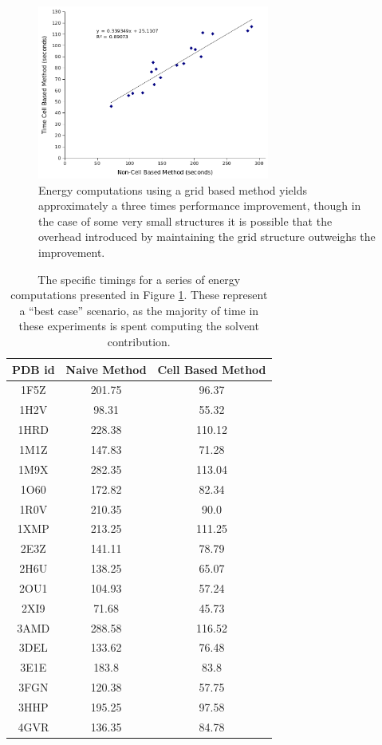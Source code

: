 \begin{figure}[H]
\begin{center}
\includegraphics[width=3in]{figures/energy_calculation_timings.png}
\caption{Energy computations using a grid based method yields approximately a three times performance improvement, though in the case of some very small structures it is possible that the overhead introduced by maintaining the grid structure outweighs the improvement.}
\label{fig:ddr}
\end{center}
\end{figure}

\begin{table}[H]
\centering
\label{table:energy_timings}
\begin{tabular}{|c|c|c|}
\hline
PDB id	& Naive Method	& Cell Based Method	\\
\hline
1F5Z	&   201.75	&   96.37	\\
1H2V	&   98.31	&   55.32	\\
1HRD	&   228.38	&   110.12	\\
1M1Z	&   147.83	&   71.28	\\
1M9X	&   282.35	&   113.04	\\
1O60	&   172.82	&   82.34	\\
1R0V	&   210.35	&   90.0    \\
1XMP	&   213.25	&   111.25	\\
2E3Z	&   141.11	&   78.79	\\
2H6U	&   138.25	&   65.07	\\
2OU1	&   104.93	&   57.24	\\
2XI9	&   71.68	&   45.73	\\
3AMD	&   288.58	&   116.52	\\
3DEL	&   133.62	&   76.48	\\
3E1E	&   183.8	&   83.8	\\
3FGN	&   120.38	&   57.75	\\
3HHP	&   195.25	&   97.58	\\
4GVR	&   136.35	&   84.78	\\
\hline
\end{tabular}
\caption{The specific timings for a series of energy computations presented in Figure \ref{fig:ddr}.
These represent a ``best case'' scenario, as the majority of time in these experiments is spent computing the solvent contribution.}
\end{table}



